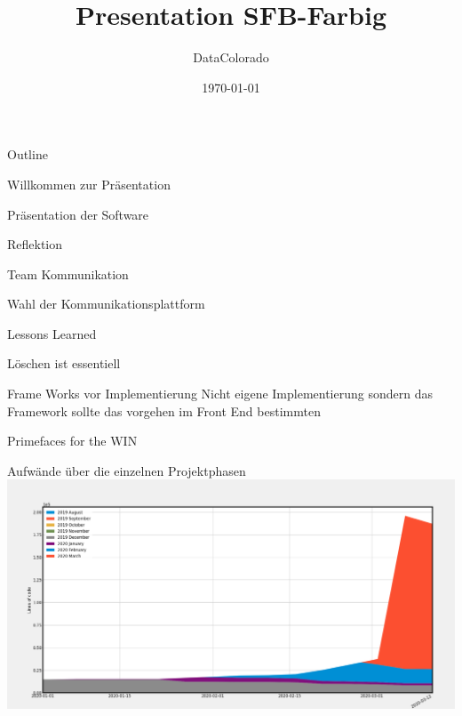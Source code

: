 \documentclass[presentation]{beamer}
\author{DataColorado}
\date{\today}
\title{Presentation SFB-Farbig}
\begin{document}
\maketitle
\begin{frame}{Outline}
\tableofcontents
\end{frame}


\begin{frame}[label={sec:org7880101}]{Willkommen zur Präsentation}
\end{frame}
\begin{frame}[label={sec:org42d1de8}]{Präsentation der Software}
\end{frame}
\begin{frame}[label={sec:org781fa61}]{Reflektion}
\end{frame}
\begin{frame}[label={sec:orga42ae55}]{Team Kommunikation}
\begin{block}{Wahl der Kommunikationsplattform}
\end{block}
\end{frame}

\begin{frame}[label={sec:orgca97e8d}]{Lessons Learned}
\begin{block}{Löschen ist essentiell}
\end{block}
\begin{block}{Frame Works vor Implementierung}
Nicht eigene Implementierung sondern das Framework sollte das vorgehen im Front End bestimmten
\end{block}
\begin{block}{Primefaces for the WIN}
\end{block}
\end{frame}


\begin{frame}[label={sec:org3934d65}]{Aufwände über die einzelnen Projektphasen}
\includegraphics[width=1\textwidth]{project.png} 
\end{frame}
\end{document}
